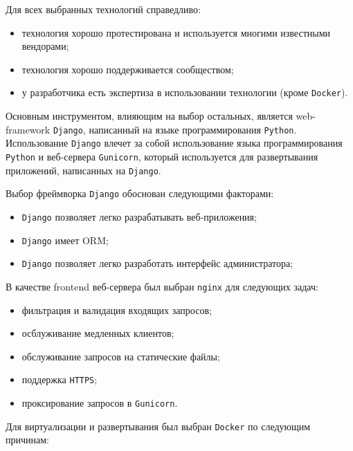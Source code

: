 \documentclass[oneside, final, 14pt]{extarticle}
\begin{document}
Для всех выбранных технологий справедливо:

\begin{itemize}
\item{технология хорошо протестирована и используется многими известными вендорами;}
\item{технология хорошо поддерживается сообществом;}
\item{у разработчика есть экспертиза в использовании технологии (кроме \texttt{Docker}).}
\end{itemize}

\vspace{0.5cm}

Основным инструментом, влияющим на выбор остальных, является web-framework \texttt{Django},
написанный на языке программирования \texttt{Python}. Использование \texttt{Django} влечет за собой
использование языка программирования \texttt{Python} и веб-сервера  \texttt{Gunicorn}, который
используется для развертывания приложений, написанных на \texttt{Django}.

Выбор фреймворка \texttt{Django} обоснован следующими факторами:

\begin{itemize}
\item{\texttt{Django} позволяет легко разрабатывать веб-приложения;}
\item{\texttt{Django} имеет ORM;}
\item{\texttt{Django} позволяет легко разработать интерфейс администратора;}
\end{itemize}

\vspace{0.5cm}

В качестве frontend веб-сервера был выбран \texttt{nginx} для следующих задач:

\begin{itemize}
\item{фильтрация и валидация входящих запросов;}
\item{осблуживание медленных клиентов;}
\item{обслуживание запросов на статические файлы;}
\item{поддержка \texttt{HTTPS};}
\item{проксирование запросов в \texttt{Gunicorn}.}
\end{itemize}

\vspace{0.5cm}

Для виртуализации и развертывания был выбран \texttt{Docker} по следующим причинам:
\end{document}
